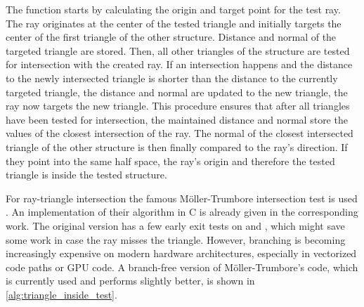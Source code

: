 %
The function starts by calculating the origin and target point for the test ray.
The ray originates at the center of the tested triangle and initially targets the center of the first triangle of the other structure.
Distance and normal of the targeted triangle are stored.
Then, all other triangles of the structure are tested for intersection with the created ray.
If an intersection happens and the distance to the newly intersected triangle is shorter than the distance to the currently targeted triangle, the distance and normal are updated to the new triangle, \ie the ray now targets the new triangle.
This procedure ensures that after all triangles have been tested for intersection, the maintained distance and normal store the values of the closest intersection of the ray.
The normal of the closest intersected triangle of the other structure is then finally compared to the ray's direction.
If they point into the same half space, the ray's origin and therefore the tested triangle is inside the tested structure.

For ray-triangle intersection the famous Möller-Trumbore intersection test is used \cite{ray_triangle_intersection_moller}.
An implementation of their algorithm in C is already given in the corresponding work.
The original version has a few early exit tests on  and , which might save some work in case the ray misses the triangle.
However, branching is becoming increasingly expensive on modern hardware architectures, especially in vectorized code paths or GPU code.
A branch-free version of Möller-Trumbore's code, which is currently used and performs slightly better, is shown in \cref{alg:triangle_inside_test}.

